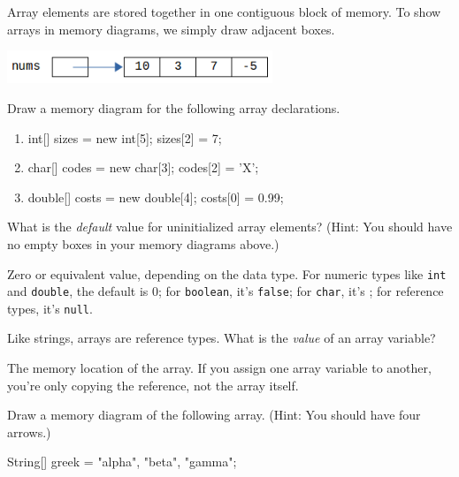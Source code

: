 
Array elements are stored together in one contiguous block of memory. To show arrays in memory diagrams, we simply draw adjacent boxes.

\begin{center}

\vspace{1ex}
\includegraphics[width=225pt]{array-diagram1.png}
\end{center}




\Q Draw a memory diagram for the following array declarations.

\begin{enumerate}

\item
\begin{javalst}
int[] sizes = new int[5];
sizes[2] = 7;
\end{javalst}

\item
\begin{javalst}
char[] codes = new char[3];
codes[2] = 'X';
\end{javalst}

\item
\begin{javalst}
double[] costs = new double[4];
costs[0] = 0.99;
\end{javalst}

\end{enumerate}


\Q What is the \emph{default} value for uninitialized array elements? (Hint: You should have no empty boxes in your memory diagrams above.)

\begin{answer}
Zero or equivalent value, depending on the data type.
For numeric types like {\tt int} and {\tt double}, the default is 0; for {\tt boolean}, it's {\tt false}; for {\tt char}, it's {\tt {}\qs}; for reference types, it's {\tt null}.
\end{answer}


\Q Like strings, arrays are reference types. What is the \emph{value} of an array variable?

\begin{answer}
The memory location of the array. If you assign one array variable to another, you're only copying the reference, not the array itself.
\end{answer}


\Q Draw a memory diagram of the following array.
(Hint: You should have four arrows.)

\begin{javalst}
String[] greek = {"alpha", "beta", "gamma"};
\end{javalst}

\begin{answer}
\end{answer}

